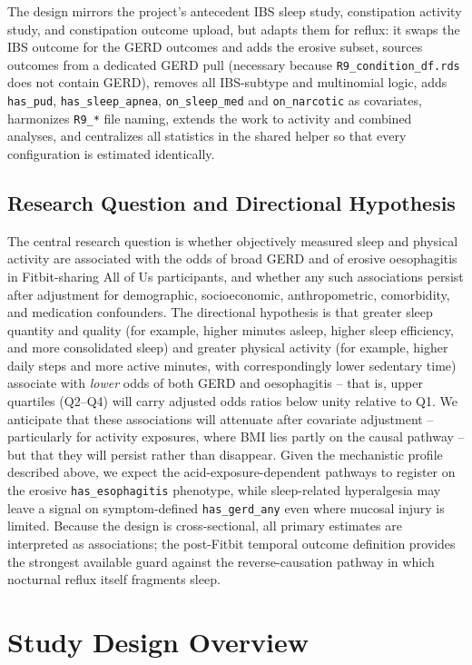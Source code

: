 \documentclass[11pt]{article}
\newcommand{\code}[1]{\texttt{\small #1}}
\begin{document}
The design mirrors the project's antecedent IBS sleep study, constipation activity study, and constipation outcome upload, but adapts them for reflux: it swaps the IBS outcome for the GERD outcomes and adds the erosive subset, sources outcomes from a dedicated GERD pull (necessary because \code{R9_condition_df.rds} does not contain GERD), removes all IBS-subtype and multinomial logic, adds \code{has_pud}, \code{has_sleep_apnea}, \code{on_sleep_med} and \code{on_narcotic} as covariates, harmonizes \code{R9_*} file naming, extends the work to activity and combined analyses, and centralizes all statistics in the shared helper so that every configuration is estimated identically.

\subsection{Research Question and Directional Hypothesis}

The central research question is whether objectively measured sleep and physical activity are associated with the odds of broad GERD and of erosive oesophagitis in Fitbit-sharing All of Us participants, and whether any such associations persist after adjustment for demographic, socioeconomic, anthropometric, comorbidity, and medication confounders. The directional hypothesis is that greater sleep quantity and quality (for example, higher minutes asleep, higher sleep efficiency, and more consolidated sleep) and greater physical activity (for example, higher daily steps and more active minutes, with correspondingly lower sedentary time) associate with \emph{lower} odds of both GERD and oesophagitis -- that is, upper quartiles (Q2--Q4) will carry adjusted odds ratios below unity relative to Q1. We anticipate that these associations will attenuate after covariate adjustment -- particularly for activity exposures, where BMI lies partly on the causal pathway -- but that they will persist rather than disappear. Given the mechanistic profile described above, we expect the acid-exposure-dependent pathways to register on the erosive \code{has_esophagitis} phenotype, while sleep-related hyperalgesia may leave a signal on symptom-defined \code{has_gerd_any} even where mucosal injury is limited. Because the design is cross-sectional, all primary estimates are interpreted as associations; the post-Fitbit temporal outcome definition provides the strongest available guard against the reverse-causation pathway in which nocturnal reflux itself fragments sleep.\section{Study Design Overview}
\end{document}
